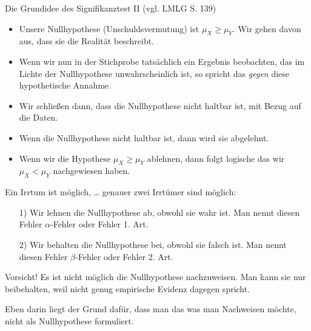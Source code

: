 \documentclass[usenames,dvipsnames,handout]{beamer}
\begin{document}
\begin{frame}{Die Grundidee des Signifikanztest II (vgl. LMLG S. 139)}
\begin{itemize}
\item{Unsere Nullhypothese (Unschuldsvermutung) ist $\mu_{X} \geq \mu_{Y}.$ Wir gehen davon aus, dass sie die Realität
beschreibt.}\pause
\item{Wenn wir nun in der Stichprobe tatsächlich ein Ergebnis beobachten, das im Lichte der Nullhypothese unwahrscheinlich ist, so spricht
das \textit{gegen} diese hypothetische Annahme. }\pause
\item{Wir schließen dann, dass die Nullhypothese nicht haltbar ist, mit Bezug auf die Daten.}\pause
\item{Wenn die Nullhypothese nicht haltbar ist, dann wird sie abgelehnt. }
\item{Wenn wir die Hypothese $\mu_{X} \geq \mu_{Y}$ ablehnen, dann folgt logische das wir $\mu_{X} < \mu_{Y}$ nachgewiesen haben.}
\end{itemize}
\end{frame}


\begin{frame}{Ein Irrtum ist möglich, \dots}
genauer zwei Irrtümer sind möglich:
\begin{itemize}
\item[1)]{Wir lehnen die Nullhypothese ab, obwohl sie wahr ist. Man nennt diesen Fehler $\alpha$-Fehler oder Fehler 1. Art.}\pause
\item[2)]{Wir behalten die Nullhypothese bei, obwohl sie falsch ist. Man nennt diesen Fehler $\beta$-Fehler oder Fehler 2. Art.}
\end{itemize}
\begin{block}{Vorsicht!}
Es ist nicht möglich die Nullhypothese nachzuweisen. Man kann sie nur beibehalten, weil nicht genug empirische 
Evidenz dagegen spricht.
\end{block}\pause
Eben darin liegt der Grund dafür, dass man das was man Nachweisen möchte, nicht als Nullhypothese formuliert.
\end{frame}



%
\end{document}
